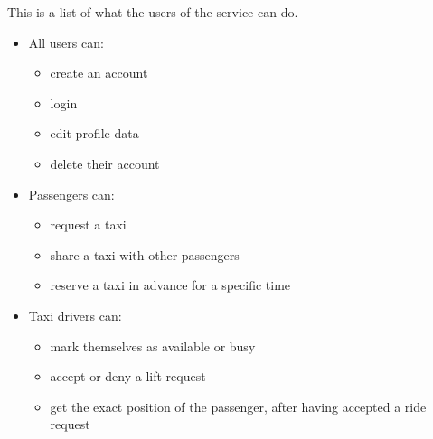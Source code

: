 This is a list of what the users of the service can do.
\begin{itemize}
    \item All users can:
        \begin{itemize}
            \item create an account
            \item login
            \item edit profile data
            \item delete their account
        \end{itemize}
    \item Passengers can:
        \begin{itemize}
            \item request a taxi
            \item share a taxi with other passengers
            \item reserve a taxi in advance for a specific time
        \end{itemize}
    \item Taxi drivers can:
        \begin{itemize}
            \item mark themselves as available or busy
            \item accept or deny a lift request
            \item get the exact position of the passenger, after having accepted a ride request
        \end{itemize}
\end{itemize}
